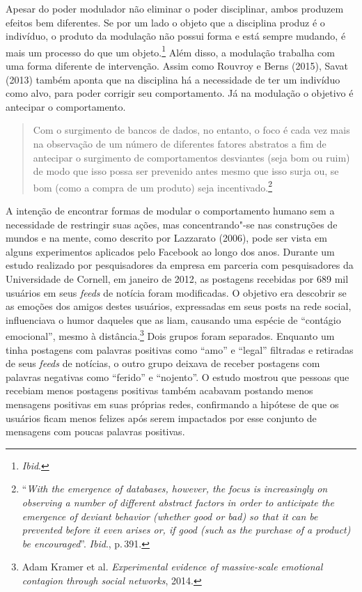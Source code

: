 Apesar do poder modulador não eliminar o poder disciplinar, ambos
produzem efeitos bem diferentes. Se por um lado o objeto que a
disciplina produz é o indivíduo, o produto da modulação não possui forma
e está sempre mudando, é mais um processo do que um objeto.\footnote{\textit{Ibid}.}
Além disso, a modulação trabalha com uma forma diferente de
intervenção. Assim como Rouvroy e Berns (2015), Savat (2013) também
aponta que na disciplina há a necessidade de ter um indivíduo como alvo,
para poder corrigir seu comportamento. Já na modulação o objetivo é
antecipar o comportamento.

\begin{quote}
Com o surgimento de bancos de dados, no entanto, o foco é cada vez mais
na observação de um número de diferentes fatores abstratos a fim de
antecipar o surgimento de comportamentos desviantes (seja bom ou ruim)
de modo que isso possa ser prevenido antes mesmo que isso surja ou, se
bom (como a compra de um produto) seja incentivado.\footnote{``\emph{With the
  emergence of databases, however, the focus is increasingly on
  observing a number of different abstract factors in order to
  anticipate the emergence of deviant behavior (whether good or bad) so
  that it can be prevented before it even arises or, if good (such as
  the purchase of a product) be encouraged}''. \textit{Ibid}., p.\,391.}
\end{quote}

A intenção de encontrar formas de modular o comportamento humano sem a
necessidade de restringir suas ações, mas concentrando"-se nas
construções de mundos e na mente, como descrito por Lazzarato (2006),
pode ser vista em alguns experimentos aplicados pelo Facebook ao longo
dos anos. Durante um estudo realizado por pesquisadores da empresa em
parceria com pesquisadores da Universidade de Cornell, em janeiro de
2012, as postagens recebidas por 689 mil usuários em seus \emph{feeds} de notícia
foram modificadas. O objetivo era descobrir se as emoções dos amigos
destes usuários, expressadas em seus posts na rede social, influenciava
o humor daqueles que as liam, causando uma espécie de ``contágio
emocional'', mesmo à distância.\footnote{Adam Kramer et al. \emph{Experimental evidence of massive-scale emotional contagion through social networks}, 2014.} Dois
grupos foram separados. Enquanto um tinha postagens com palavras
positivas como ``amo'' e ``legal'' filtradas e retiradas de seus \emph{feeds}
de notícias, o outro grupo deixava de receber postagens com palavras negativas
como ``ferido'' e ``nojento''. O estudo mostrou que pessoas que recebiam
menos postagens positivas também acabavam postando menos mensagens
positivas em suas próprias redes, confirmando a hipótese de que os
usuários ficam menos felizes após serem impactados por esse conjunto de
mensagens com poucas palavras positivas.


